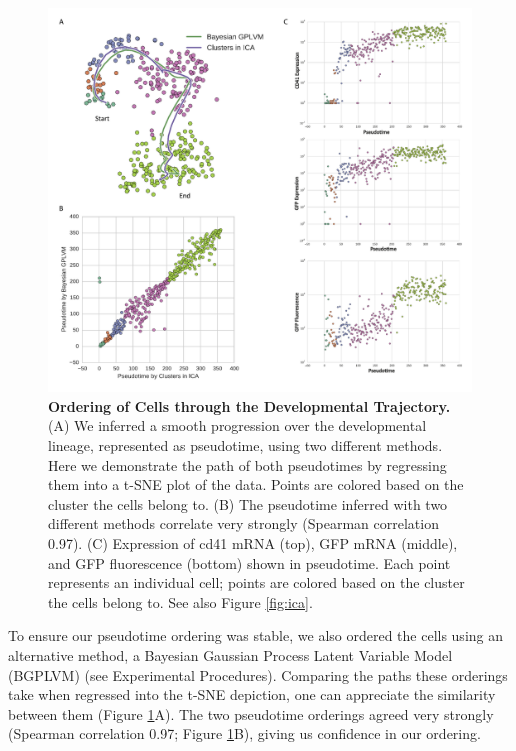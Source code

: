 \begin{figure}
    \centering
    \includegraphics[width=\textwidth]{"Figure2"}
    \caption[Ordering of Cells through the Developmental Trajectory]{\textbf{Ordering of Cells through the Developmental Trajectory.} (A)	We inferred a smooth progression over the developmental lineage, represented as pseudotime, using two different methods. Here we demonstrate the path of both pseudotimes by regressing them into a t-SNE plot of the data. Points are colored based on the cluster the cells belong to. (B)	The pseudotime inferred with two different methods correlate very strongly (Spearman correlation 0.97). (C)	Expression of cd41 mRNA (top), GFP mRNA (middle), and GFP fluorescence (bottom) shown in pseudotime. Each point represents an individual cell; points are colored based on the cluster the cells belong to. See also Figure \ref{fig:ica}.}
    \label{fig:pseudotime}
\end{figure}

To ensure our pseudotime ordering was stable, we also ordered the cells using an alternative method, a Bayesian Gaussian Process Latent Variable Model (BGPLVM) \cite{Titsias2010-hq} (see Experimental Procedures). Comparing the paths these orderings take when regressed into the t-SNE depiction, one can appreciate the similarity between them (Figure \ref{fig:pseudotime}A). The two pseudotime orderings agreed very strongly (Spearman correlation 0.97; Figure \ref{fig:pseudotime}B), giving us confidence in our ordering.

